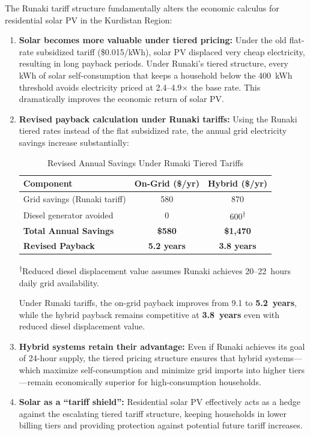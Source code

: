 The Runaki tariff structure fundamentally alters the economic calculus for residential solar PV in the Kurdistan Region:

\begin{enumerate}
    \item \textbf{Solar becomes more valuable under tiered pricing:} Under the old flat-rate subsidized tariff (\$0.015/kWh), solar PV displaced very cheap electricity, resulting in long payback periods. Under Runaki's tiered structure, every kWh of solar self-consumption that keeps a household below the 400~kWh threshold avoids electricity priced at 2.4--4.9$\times$ the base rate. This dramatically improves the economic return of solar PV.
    
    \item \textbf{Revised payback calculation under Runaki tariffs:} Using the Runaki tiered rates instead of the flat subsidized rate, the annual grid electricity savings increase substantially:

    \begin{table}[H]
    \centering
    \caption{Revised Annual Savings Under Runaki Tiered Tariffs}
    \label{tab:runaki_savings}
    \small
    \begin{tabular}{@{}p{5cm} c c@{}}
    \toprule
    \textbf{Component} & \textbf{On-Grid (\$/yr)} & \textbf{Hybrid (\$/yr)} \\
    \midrule
    Grid savings (Runaki tariff) & 580 & 870 \\
    Diesel generator avoided & 0 & 600\textsuperscript{$\dagger$} \\
    \midrule
    \textbf{Total Annual Savings} & \textbf{\$580} & \textbf{\$1,470} \\
    \textbf{Revised Payback} & \textbf{5.2 years} & \textbf{3.8 years} \\
    \bottomrule
    \end{tabular}
    \begin{flushleft}
    \small\textsuperscript{$\dagger$}Reduced diesel displacement value assumes Runaki achieves 20--22~hours daily grid availability.
    \end{flushleft}
    \end{table}

    Under Runaki tariffs, the on-grid payback improves from 9.1 to \textbf{5.2~years}, while the hybrid payback remains competitive at \textbf{3.8~years} even with reduced diesel displacement value.

    \item \textbf{Hybrid systems retain their advantage:} Even if Runaki achieves its goal of 24-hour supply, the tiered pricing structure ensures that hybrid systems---which maximize self-consumption and minimize grid imports into higher tiers---remain economically superior for high-consumption households.
    
    \item \textbf{Solar as a ``tariff shield'':} Residential solar PV effectively acts as a hedge against the escalating tiered tariff structure, keeping households in lower billing tiers and providing protection against potential future tariff increases.
\end{enumerate}


